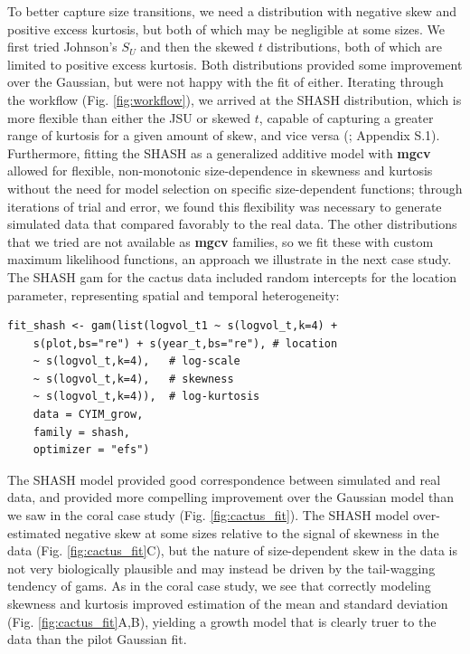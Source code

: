 \documentclass[12pt]{article}
\begin{document}
To better capture size transitions, we need a distribution with negative skew and positive excess kurtosis, but both of which may be negligible at some sizes.
We first tried Johnson's $S_{U}$ and then the skewed $t$ distributions, both of which are limited to positive excess kurtosis.
Both distributions provided some improvement over the Gaussian, but were not happy with the fit of either. 
Iterating through the workflow (Fig. \ref{fig:workflow}), we arrived at the SHASH distribution, which is more flexible than either the JSU or skewed $t$, capable of capturing a greater range of kurtosis for a given amount of skew, and vice versa (\cite{jones-pewsey-2009}; Appendix S.1). 
Furthermore, fitting the SHASH as a generalized additive model with \textbf{mgcv} allowed for flexible, non-monotonic size-dependence in skewness and kurtosis without the need for model selection on specific size-dependent functions; through iterations of trial and error, we found this flexibility was necessary to generate simulated data that compared favorably to the real data. 
The other distributions that we tried are not available as \textbf{mgcv} families, so we fit these with custom maximum likelihood functions, an approach we illustrate in the next case study.
The SHASH gam for the cactus data included random intercepts for the location parameter, representing spatial and temporal heterogeneity:
\begin{lstlisting}
fit_shash <- gam(list(logvol_t1 ~ s(logvol_t,k=4) + 
    s(plot,bs="re") + s(year_t,bs="re"), # location 
    ~ s(logvol_t,k=4),   # log-scale
    ~ s(logvol_t,k=4),   # skewness
    ~ s(logvol_t,k=4)),  # log-kurtosis
    data = CYIM_grow, 
    family = shash,  
    optimizer = "efs")
\end{lstlisting}

The SHASH model provided good correspondence between simulated and real data, and provided more compelling improvement over the Gaussian model than we saw in the coral case study (Fig. \ref{fig:cactus_fit}). 
The SHASH model over-estimated negative skew at some sizes relative to the signal of skewness in the data (Fig. \ref{fig:cactus_fit}C), but the nature of size-dependent skew in the data is not very biologically plausible and may instead be driven by the tail-wagging tendency of gams. 
As in the coral case study, we see that correctly modeling skewness and kurtosis improved estimation of the mean and standard deviation (Fig. \ref{fig:cactus_fit}A,B), yielding a growth model that is clearly truer to the data than the pilot Gaussian fit. 
\end{document}
